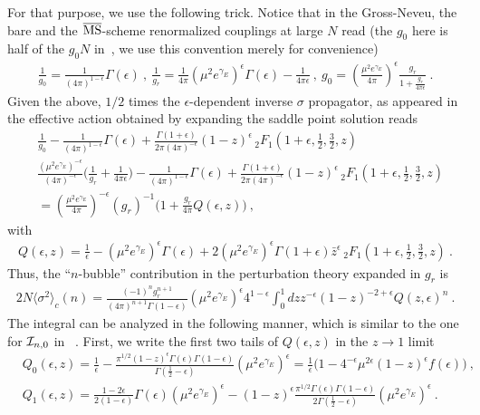 \documentclass[a4paper,11pt]{article}
\begin{document}
For that purpose, we use the following trick. Notice that in the Gross-Neveu, the bare and the $\overline{\rm MS}$-scheme renormalized couplings at large $N$ read (the $g_0$ here is half of the $g_0N$ in~\cite{Marino:2024uco}, we use this convention merely for convenience)
\begin{align}
\frac{1}{g_0}=\frac{1}{(4\pi)^{1-\epsilon}}\Gamma(\epsilon) \ , \  \frac{1}{g_r}=\frac{1}{4\pi}(\mu^2e^{\gamma_E})^{\epsilon}\Gamma(\epsilon)-\frac{1}{4\pi \epsilon} \ , \ 
g_0=\left(\frac{\mu^2e^{\gamma_E}}{4\pi }\right)^{\epsilon}\frac{g_r}{1+\frac{g_r}{4\pi \epsilon}} \ .
\end{align}
Given the above, $1/2$ times the $\epsilon$-dependent inverse $\sigma$ propagator, as appeared in the effective action obtained by expanding the saddle point solution reads 
\begin{align}
&\frac{1}{g_0}-\frac{1}{(4\pi)^{1-\epsilon}}\Gamma(\epsilon)+\frac{\Gamma(1+\epsilon)}{2\pi(4\pi)^{-\epsilon}}(1-z)^{\epsilon}\,_2F_1\left(1+\epsilon,\frac{1}{2},\frac{3}{2},z\right)\nonumber \\ 
&\frac{(\mu^2e^{\gamma_E})^{-\epsilon}}{(4\pi)^{-\epsilon}}\bigg(\frac{1}{g_r}+\frac{1}{4\pi \epsilon}\bigg)-\frac{1}{(4\pi)^{1-\epsilon}}\Gamma(\epsilon)+\frac{\Gamma(1+\epsilon)}{2\pi(4\pi)^{-\epsilon}}(1-z)^{\epsilon}\,_2F_1\left(1+\epsilon,\frac{1}{2},\frac{3}{2},z\right) \nonumber \\ 
&=\left(\frac{\mu^2 e^{\gamma_E}}{4\pi}\right)^{-\epsilon}(g_r)^{-1}\bigg(1+\frac{g_r}{4\pi} Q(\epsilon,z)\bigg) \ ,
\end{align}
with 
\begin{align}
Q(\epsilon,z)= \frac{1}{\epsilon}-(\mu^2e^{\gamma_E})^{\epsilon}\Gamma(\epsilon)+2(\mu^2e^{\gamma_E})^{\epsilon}\Gamma(1+\epsilon)\bar z^{\epsilon}\,_2F_1\left(1+\epsilon,\frac{1}{2},\frac{3}{2},z\right)  \ .
\end{align}
Thus, the ``$n$-bubble'' contribution in the perturbation theory expanded in $g_r$ is
\begin{align}
2N\langle \sigma^2\rangle_c(n)=\frac{(-1)^ng_r^{n+1}}{(4\pi)^{n+1}\Gamma(1-\epsilon)}(\mu^2e^{\gamma_E})^{\epsilon}4^{1-\epsilon}\int_0^1 dz z^{-\epsilon}(1-z)^{-2+\epsilon} Q(z,\epsilon)^n \ .
\end{align}
The integral can be analyzed in the following manner, which is similar to the one for ${\cal I}_{n,0}$ in~\cite{Marino:2021six} . First, we write the first two tails of $Q(\epsilon,z)$ in the $z\rightarrow 1$ limit
\begin{align}
&Q_0(\epsilon,z)=\frac{1}{\epsilon}-\frac{\pi ^{1/2} (1-z)^{\epsilon}\Gamma(\epsilon)\Gamma(1-\epsilon)}{\Gamma \left(\frac{1}{2}-\epsilon\right)}(\mu^2e^{\gamma_E})^{\epsilon}=\frac{1}{\epsilon}\bigg(1-4^{-\epsilon}\mu^{2\epsilon}(1-z)^{\epsilon}f(\epsilon)\bigg) \  , \\
&Q_1(\epsilon,z)=\frac{1-2\epsilon}{2(1-\epsilon)}\Gamma (\epsilon)(\mu^2e^{\gamma_E})^{\epsilon} -(1-z)^{\epsilon}\frac{\pi ^{1/2} \Gamma(\epsilon)\Gamma(1-\epsilon)}{2 \Gamma \left(\frac{1}{2}-\epsilon\right)}(\mu^2e^{\gamma_E})^{\epsilon} \ .
\end{align}
\end{document}
